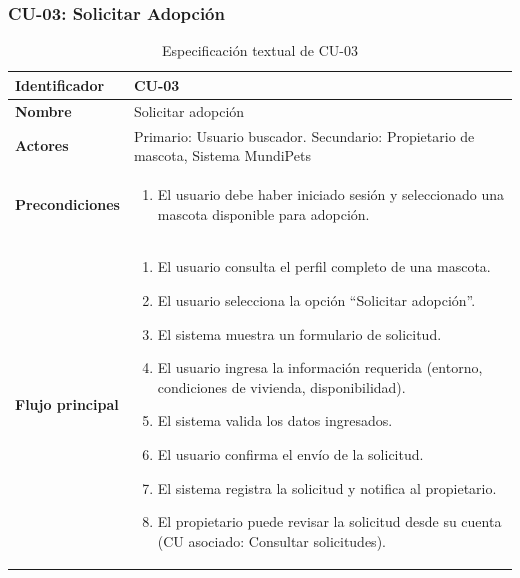 \documentclass[journal,onecolumn]{IEEEtran}
\begin{document}
\subsubsection{CU-03: Solicitar Adopción}

\begin{table}[H]
\caption{Especificación textual de CU-03}
\label{tab:cu03}
\begin{tabularx}{\textwidth}{|l|X|}
\hline
\textbf{Identificador}       & CU-03 \\
\hline
\textbf{Nombre}              & Solicitar adopción \\
\hline
\textbf{Actores}             & Primario: Usuario buscador. Secundario: Propietario de mascota, Sistema MundiPets \\
\hline
\textbf{Precondiciones}      & \begin{enumerate}[leftmargin=*,topsep=0pt]
                                 \item El usuario debe haber iniciado sesión y seleccionado una mascota disponible para adopción.
                               \end{enumerate} \\
\hline
\textbf{Flujo principal}     & \begin{enumerate}[leftmargin=*,topsep=0pt]
                                 \item El usuario consulta el perfil completo de una mascota.
                                 \item El usuario selecciona la opción ``Solicitar adopción''.
                                 \item El sistema muestra un formulario de solicitud.
                                 \item El usuario ingresa la información requerida (entorno, condiciones de vivienda, disponibilidad).
                                 \item El sistema valida los datos ingresados.
                                 \item El usuario confirma el envío de la solicitud.
                                 \item El sistema registra la solicitud y notifica al propietario.
                                 \item El propietario puede revisar la solicitud desde su cuenta (CU asociado: Consultar solicitudes).
                               \end{enumerate} \\

\end{tabularx}
\end{table}
\end{document}
